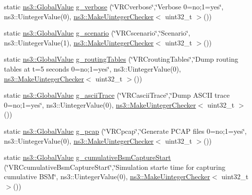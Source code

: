 \begin{DoxyCompactItemize}
\item 
static \hyperlink{classns3_1_1GlobalValue}{ns3\+::\+Global\+Value} \hyperlink{vanet-routing-compare_8cc_a7e9e2d572f246b22c0207d722e616181}{g\+\_\+verbose} (\char`\"{}V\+R\+Cverbose\char`\"{},\char`\"{}Verbose 0=no;1=yes\char`\"{}, ns3\+::\+Uinteger\+Value(0), \hyperlink{namespacens3_aed274764da411ed9397a3524a7c9abb8}{ns3\+::\+Make\+Uinteger\+Checker}$<$ uint32\+\_\+t $>$())
\item 
static \hyperlink{classns3_1_1GlobalValue}{ns3\+::\+Global\+Value} \hyperlink{vanet-routing-compare_8cc_a85759f8a43510eb0868b9089f96b3cda}{g\+\_\+scenario} (\char`\"{}V\+R\+Cscenario\char`\"{},\char`\"{}Scenario\char`\"{}, ns3\+::\+Uinteger\+Value(1), \hyperlink{namespacens3_aed274764da411ed9397a3524a7c9abb8}{ns3\+::\+Make\+Uinteger\+Checker}$<$ uint32\+\_\+t $>$())
\item 
static \hyperlink{classns3_1_1GlobalValue}{ns3\+::\+Global\+Value} \hyperlink{vanet-routing-compare_8cc_a990644e3b0d56c9f44ffb254f8848d3d}{g\+\_\+routing\+Tables} (\char`\"{}V\+R\+Crouting\+Tables\char`\"{},\char`\"{}Dump routing tables at t=5 seconds 0=no;1=yes\char`\"{}, ns3\+::\+Uinteger\+Value(0), \hyperlink{namespacens3_aed274764da411ed9397a3524a7c9abb8}{ns3\+::\+Make\+Uinteger\+Checker}$<$ uint32\+\_\+t $>$())
\item 
static \hyperlink{classns3_1_1GlobalValue}{ns3\+::\+Global\+Value} \hyperlink{vanet-routing-compare_8cc_a09b1c227be2534652212bf45affc48b6}{g\+\_\+ascii\+Trace} (\char`\"{}V\+R\+Cascii\+Trace\char`\"{},\char`\"{}Dump A\+S\+C\+II trace 0=no;1=yes\char`\"{}, ns3\+::\+Uinteger\+Value(0), \hyperlink{namespacens3_aed274764da411ed9397a3524a7c9abb8}{ns3\+::\+Make\+Uinteger\+Checker}$<$ uint32\+\_\+t $>$())
\item 
static \hyperlink{classns3_1_1GlobalValue}{ns3\+::\+Global\+Value} \hyperlink{vanet-routing-compare_8cc_a9cf2ca959707252d73a2c9b44ced0829}{g\+\_\+pcap} (\char`\"{}V\+R\+Cpcap\char`\"{},\char`\"{}Generate P\+C\+AP files 0=no;1=yes\char`\"{}, ns3\+::\+Uinteger\+Value(0), \hyperlink{namespacens3_aed274764da411ed9397a3524a7c9abb8}{ns3\+::\+Make\+Uinteger\+Checker}$<$ uint32\+\_\+t $>$())
\item 
static \hyperlink{classns3_1_1GlobalValue}{ns3\+::\+Global\+Value} \hyperlink{vanet-routing-compare_8cc_a1324251d8e66b676c46cc6a261bfd7ad}{g\+\_\+cumulative\+Bsm\+Capture\+Start} (\char`\"{}V\+R\+Ccumulative\+Bsm\+Capture\+Start\char`\"{},\char`\"{}Simulation starte time for capturing cumulative B\+SM\char`\"{}, ns3\+::\+Uinteger\+Value(0), \hyperlink{namespacens3_aed274764da411ed9397a3524a7c9abb8}{ns3\+::\+Make\+Uinteger\+Checker}$<$ uint32\+\_\+t $>$())

\end{DoxyCompactItemize}
